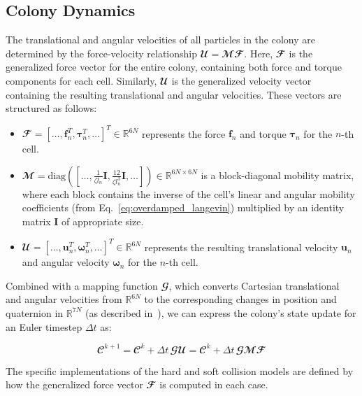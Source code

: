 \documentclass[conference]{IEEEtran}
\begin{document}
\subsection{Colony Dynamics}

The translational and angular velocities of all particles in the colony are determined by the force-velocity relationship $\mathbfcal{U} = \mathbfcal{M} \mathbfcal{F}$. Here, $\mathbfcal{F}$ is the generalized force vector for the entire colony, containing both force and torque components for each cell. Similarly, $\mathbfcal{U}$ is the generalized velocity vector containing the resulting translational and angular velocities. These vectors are structured as follows:

\begin{itemize}
    \item
          $\mathbfcal{F} = [\dots, \mathbf{f}_n^T, \boldsymbol{\tau}_n^T, \dots]^T \in \mathbb{R}^{6N}$ represents the force $\mathbf{f}_n$ and torque $\boldsymbol{\tau}_n$ for the $n$-th cell.
    \item
          $\mathbfcal{M} = \text{diag}([\dots, \frac{1}{\zeta l_n}\mathbf{I}, \frac{12}{\zeta l_n^3}\mathbf{I}, \dots]) \in \mathbb{R}^{6N \times 6N}$ is a block-diagonal mobility matrix, where each block contains the inverse of the cell's linear and angular mobility coefficients (from Eq.~\ref{eq:overdamped_langevin}) multiplied by an identity matrix $\mathbf{I}$ of appropriate size.
    \item
          $\mathbfcal{U} = [\dots, \mathbf{u}_n^T, \boldsymbol{\omega}_n^T, \dots]^T \in \mathbb{R}^{6N}$ represents the resulting translational velocity $\mathbf{u}_n$ and angular velocity $\boldsymbol{\omega}_n$ for the $n$-th cell.
\end{itemize}


Combined with a mapping function $\mathbfcal{G}$, which converts Cartesian translational and angular velocities from $\mathbb{R}^{6N}$ to the corresponding changes in position and quaternion in $\mathbb{R}^{7N}$ (as described in~\cite{Weady2024}), we can express the colony's state update for an Euler timestep $\Delta t$ as:

\begin{equation} \label{eq:colony_update}
    \mathbfcal{C}^{k+1} = \mathbfcal{C}^k + \Delta t \, \mathbfcal{G} \mathbfcal{U} = \mathbfcal{C}^k + \Delta t \, \mathbfcal{G} \mathbfcal{M} \mathbfcal{F}
\end{equation}


The specific implementations of the hard and soft collision models are defined by how the generalized force vector $\mathbfcal{F}$ is computed in each case.
\end{document}
